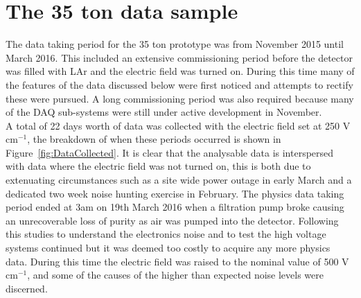 \chapter{The 35 ton data sample}  %
  
\graphicspath{{35tonData/Figs/PDF/}{35tonData/Figs/Raster/}{35tonData/Figs/Vector/}}

The data taking period for the 35 ton prototype was from November 2015 until March 2016. This included an extensive commissioning period before the detector was filled with LAr and the electric field was turned on. During this time many of the features of the data discussed below were first noticed and attempts to rectify these were pursued. A long commissioning period was also required because many of the DAQ sub-systems were still under active development in November.\\

A total of 22 days worth of data was collected with the electric field set at 250 V cm$^{-1}$, the breakdown of when these periods occurred is shown in Figure~\ref{fig:DataCollected}. It is clear that the analysable data is interspersed with data where the electric field was not turned on, this is both due to extenuating circumstances such as a site wide power outage in early March and a dedicated two week noise hunting exercise in February. The physics data taking period ended at 3am on 19th March 2016 when a filtration pump broke causing an unrecoverable loss of purity as air was pumped into the detector. Following this studies to understand the electronics noise and to test the high voltage systems continued but it was deemed too costly to acquire any more physics data. During this time the electric field was raised to the nominal value of 500  V cm$^{-1}$, and some of the causes of the higher than expected noise levels were discerned. \\

